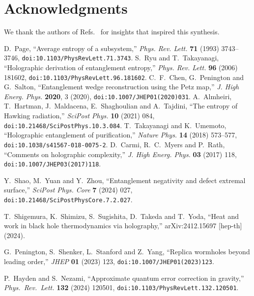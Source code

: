 \documentclass[12pt]{article}
\begin{document}
\section*{Acknowledgments}
We thank the authors of Refs.~\cite{Ryu:2006prl,Page:1993prl,Penington:2019petz,SciPost:2020islands} for insights that inspired this synthesis.

\begin{thebibliography}{99}
D.~Page, ``Average entropy of a subsystem,'' \emph{Phys. Rev. Lett.} \textbf{71} (1993) 3743--3746, \texttt{doi:10.1103/PhysRevLett.71.3743}.
S.~Ryu and T.~Takayanagi, ``Holographic derivation of entanglement entropy,'' \emph{Phys. Rev. Lett.} \textbf{96} (2006) 181602, \texttt{doi:10.1103/PhysRevLett.96.181602}.
C.~F.~Chen, G.~Penington and G.~Salton, ``Entanglement wedge reconstruction using the Petz map,'' \emph{J. High Energ. Phys.} \textbf{2020}, 3 (2020), \texttt{doi:10.1007/JHEP01(2020)031}.
A.~Almheiri, T.~Hartman, J.~Maldacena, E.~Shaghoulian and A.~Tajdini, ``The entropy of Hawking radiation,'' \emph{SciPost Phys.} \textbf{10} (2021) 084, \texttt{doi:10.21468/SciPostPhys.10.3.084}.
T.~Takayanagi and K.~Umemoto, ``Holographic entanglement of purification,'' \emph{Nature Phys.} \textbf{14} (2018) 573--577, \texttt{doi:10.1038/s41567-018-0075-2}.
D.~Carmi, R.~C.~Myers and P.~Rath, ``Comments on holographic complexity,'' \emph{J. High Energ. Phys.} \textbf{03} (2017) 118, \texttt{doi:10.1007/JHEP03(2017)118}.

Y.~Shao, M.~Yuan and Y.~Zhou, ``Entanglement negativity and defect extremal surface,'' \emph{SciPost Phys. Core} \textbf{7} (2024) 027, \texttt{doi:10.21468/SciPostPhysCore.7.2.027}.

T.~Shigemura, K.~Shimizu, S.~Sugishita, D.~Takeda and T.~Yoda, ``Heat and work in black hole thermodynamics via holography,'' arXiv:2412.15697 [hep-th] (2024).

 G.~Penington, S.~Shenker, L.~Stanford and Z.~Yang, ``Replica wormholes beyond leading order,'' \emph{JHEP} \textbf{01} (2023) 123, \texttt{doi:10.1007/JHEP01(2023)123}.

 P.~Hayden and S.~Nezami, ``Approximate quantum error correction in gravity,'' \emph{Phys.\ Rev.\ Lett.} \textbf{132} (2024) 120501, \texttt{doi:10.1103/PhysRevLett.132.120501}.


\end{thebibliography}
\end{document}
